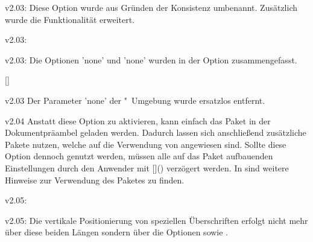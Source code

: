 \begin{Obsolete}{v2.03:}
  {}
\printobsoletelist%
%
Diese Option wurde aus Gründen der Konsistenz umbenannt. Zusätzlich wurde die 
Funktionalität erweitert.
\end{Obsolete}

\begin{Obsolete}{v2.03:}
  {}
\begin{Obsolete}{v2.03:}
  {}
\printobsoletelist%
%
Die Optionen 'none' und 'none' wurden in der 
Option  zusammengefasst.
\end{Obsolete}
\end{Obsolete}

\begin{Obsolete}{}
  {[]}
\begin{Obsolete}{v2.03}
  {}
\printobsoletelist%
%
Der Parameter 'none' der 
"~Umgebung wurde ersatzlos entfernt.
\end{Obsolete}
\end{Obsolete}


\begin{Obsolete}{v2.04}
  {}
\printobsoletelist%
%
Anstatt diese Option zu aktivieren, kann einfach das Paket  
in der Dokumentpräambel geladen werden. Dadurch lassen sich anschließend 
zusätzliche Pakete nutzen, welche auf die Verwendung von  
angewiesen sind. Sollte diese Option dennoch genutzt werden, müssen alle auf 
das Paket  aufbauenden Einstellungen durch den Anwender mit 
[\MPValue{\dots}]() 
verzögert werden. In  sind weitere Hinweise zur Verwendung 
des Paketes  zu finden.
\end{Obsolete}


\begin{Obsolete}{v2.05:}
  {}
\begin{Obsolete}{v2.05:}
  {}
\printobsoletelist%
%
Die vertikale Positionierung von speziellen Überschriften erfolgt nicht mehr 
über diese beiden Längen sondern über die Optionen  
sowie .
\end{Obsolete}
\end{Obsolete}


